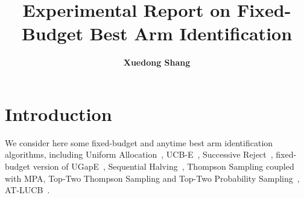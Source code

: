 \documentclass[runningheads,a4paper]{llncs}
\begin{document}
\mainmatter  %

\title{Experimental Report on Fixed-Budget Best Arm Identification}


%
%
\author{\textbf{Xuedong Shang}}
%


%
%

\toctitle{}
\maketitle


\begin{abstract}

\end{abstract}


\section{Introduction}

We consider here some fixed-budget and anytime best arm identification algorithms, including Uniform Allocation~\cite{bubeck2009}, UCB-E~\cite{audibert2010}, Successive Reject~\cite{audibert2010}, fixed-budget version of UGapE~\cite{gabillon2012},  Sequential Halving~\cite{karnin2013}, Thompson Sampling coupled with MPA, Top-Two Thompson Sampling and Top-Two Probability Sampling~\cite{russo2016}, AT-LUCB~\cite{jun2016}.
\end{document}
